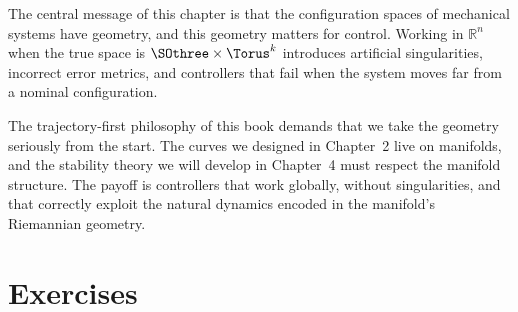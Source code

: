 \documentclass[12pt, openany]{book}
\theoremstyle{plain}
\newcommand{\Reals}{\mathbb{R}}
\begin{document}
\vspace{0.3cm}

The central message of this chapter is that the configuration spaces of
mechanical systems have geometry, and this geometry matters for control.
Working in $\Reals^n$ when the true space is $\SOthree \times \Torus^k$
introduces artificial singularities, incorrect error metrics, and
controllers that fail when the system moves far from a nominal configuration.

The trajectory-first philosophy of this book demands that we take the
geometry seriously from the start. The curves we designed in Chapter~2 live
on manifolds, and the stability theory we will develop in Chapter~4 must
respect the manifold structure. The payoff is controllers that work globally,
without singularities, and that correctly exploit the natural dynamics
encoded in the manifold's Riemannian geometry.

\section{Exercises}
\end{document}
